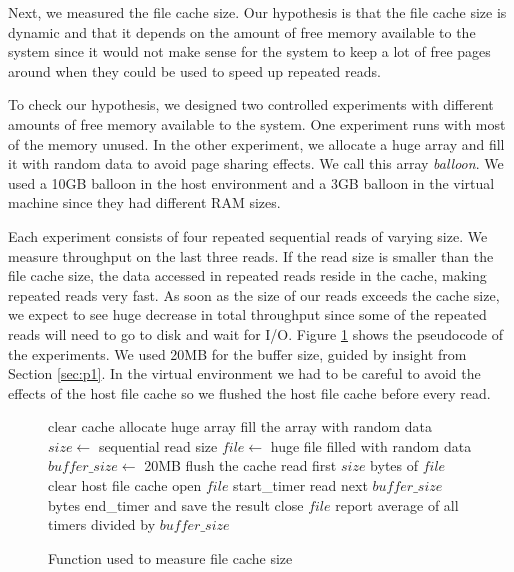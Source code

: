 Next, we measured the file cache size. Our hypothesis is that the file cache size is dynamic and that it depends on the amount of free memory available to the system since it would not make sense for the system to keep a lot of free pages around when they could be used to speed up repeated reads.

To check our hypothesis, we designed two controlled experiments with different amounts of free memory available to the system. One experiment runs with most of the memory unused. In the other experiment, we allocate a huge array and fill it with random data to avoid page sharing effects. We call this array \emph{balloon}. We used a 10GB balloon in the host environment and a 3GB balloon in the virtual machine since they had different RAM sizes.

Each experiment consists of four repeated sequential reads of varying size. We measure throughput on the last three reads. If the read size is smaller than the file cache size, the data accessed in repeated reads reside in the cache, making repeated reads very fast. As soon as the size of our reads exceeds the cache size, we expect to see huge decrease in total throughput since some of the repeated reads will need to go to disk and wait for I/O. Figure \ref{fig:p3pseudo} shows the pseudocode of the experiments. We used 20MB for the buffer size, guided by insight from Section \ref{sec:p1}. In the virtual environment we had to be careful to avoid the effects of the host file cache so we flushed the host file cache before every read.

\begin{figure}
\begin{algorithmic}
\STATE clear cache
\STATE allocate huge array
\STATE fill the array with random data
\ENDIF
\STATE $size \leftarrow$ {sequential read size}
\STATE $file \leftarrow$ {huge file filled with random data}
\STATE $buffer\_size \leftarrow$ 20MB
\STATE flush the cache
\STATE read first $size$ bytes of $file$
\STATE clear host file cache
\ENDIF
\STATE open $file$
\STATE start\_timer
\STATE read next $buffer\_size$ bytes
\STATE end\_timer and save the result
\ENDWHILE
\STATE close $file$
\ENDFOR
\STATE report average of all timers divided by $buffer\_size$
\end{algorithmic}
\caption{Function used to measure file cache size}
\label{fig:p3pseudo}
\end{figure}

